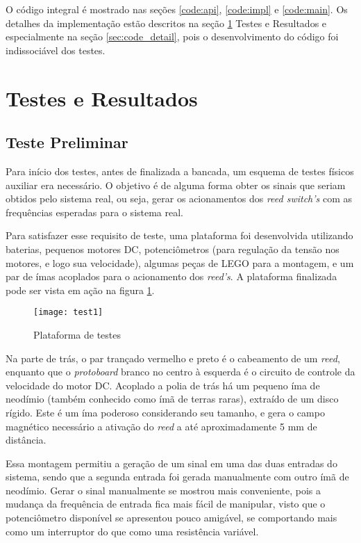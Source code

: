 \documentclass[a4paper,11pt]{article}
\begin{document}
O código integral é mostrado nas seções \ref{code:api}, \ref{code:impl} e
\ref{code:main}. Os detalhes da implementação estão descritos na seção
\ref{sec:resultados} Testes e Resultados e especialmente na seção
\ref{sec:code_detail}, pois o desenvolvimento do código foi indissociável dos
testes.

\pagebreak
%
\section{Testes e Resultados}
\label{sec:resultados}

\subsection{Teste Preliminar}

Para início dos testes, antes de finalizada a bancada, um esquema de testes
físicos auxiliar era necessário. O objetivo é de alguma forma obter os sinais
que seriam obtidos pelo sistema real, ou seja, gerar os acionamentos dos
\textit{reed switch's} com as frequências esperadas para o sistema real.

Para satisfazer esse requisito de teste, uma plataforma foi desenvolvida
utilizando baterias, pequenos motores DC, potenciômetros (para regulação da
tensão nos motores, e logo sua velocidade), algumas peças de
LEGO\textsuperscript{\textregistered} para a montagem, e um par de ímas
acoplados para o acionamento dos \textit{reed's}. A plataforma finalizada pode
ser vista em ação na figura \ref{fig:test1}.

\begin{figure}[h!]
\begin{center}
 \texttt{[image: test1]}
\end{center}
  \caption{Plataforma de testes}
  \label{fig:test1}
\end{figure}

Na parte de trás, o par trançado vermelho e preto é o cabeamento de um
\textit{reed}, enquanto que o \textit{protoboard} branco no centro à esquerda é
o circuito de controle da velocidade do motor DC. Acoplado a polia de trás há
um pequeno íma de neodímio (também conhecido como ímã de terras raras),
extraído de um disco rígido. Este é um íma poderoso considerando seu tamanho, e
gera o campo magnético necessário a ativação do \textit{reed} a até
aproximadamente 5 mm de distância.

Essa montagem permitiu a geração de um sinal em uma das duas entradas do
sistema, sendo que a segunda entrada foi gerada manualmente com outro ímã de
neodímio. Gerar o sinal manualmente se mostrou mais conveniente, pois a mudança
da frequência de entrada fica mais fácil de manipular, visto que o
potenciômetro disponível se apresentou pouco amigável, se comportando mais como
um interruptor do que como uma resistência variável.
\end{document}
